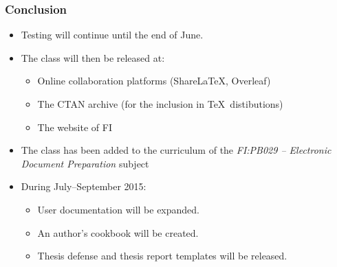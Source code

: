 \documentclass[12pt]{beamer}
\begin{document}
  \begin{frame}
    \frametitle{Conclusion}
    \begin{itemize}[<+->]
      \item Testing will continue until the end of June.
      \item The class will then be released at:\begin{itemize} 
        \item Online collaboration platforms (Share\LaTeX, Overleaf)
        \item The CTAN archive (for the inclusion in \TeX\ distibutions)
        \item The website of FI
      \end{itemize}
      \item The class has been added to the curriculum of the \emph{FI:PB029 -- Electronic Document Preparation} subject
      \item During July--September 2015:\begin{itemize} 
        \item User documentation will be expanded.
        \item An author’s cookbook will be created.
        \item Thesis defense and thesis report templates will be released.
      \end{itemize}
    \end{itemize}
  \end{frame}
\end{document}
